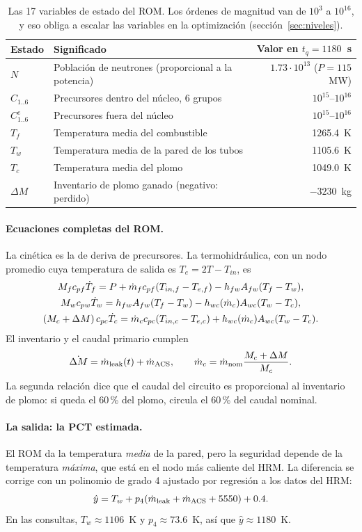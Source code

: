 \begin{table}[H]\centering\small
\begin{tabularx}{\linewidth}{@{}l Y r@{}}\toprule
Estado & Significado & Valor en $t_q=1180$~s\\\midrule
$N$ & Población de neutrones (proporcional a la potencia) & $1.73\cdot10^{13}$ ($P=115$~MW)\\
$C_{1..6}$ & Precursores dentro del núcleo, 6 grupos & $10^{15}$--$10^{16}$\\
$C^e_{1..6}$ & Precursores fuera del núcleo & $10^{15}$--$10^{16}$\\
$T_f$ & Temperatura media del combustible & 1265.4~K\\
$T_w$ & Temperatura media de la pared de los tubos & 1105.6~K\\
$T_c$ & Temperatura media del plomo & 1049.0~K\\
$\Delta M$ & Inventario de plomo ganado (negativo: perdido) & $-3230$~kg\\\bottomrule
\end{tabularx}
\caption{Las 17 variables de estado del ROM. Los órdenes de magnitud van de $10^3$ a
$10^{16}$, y eso obliga a escalar las variables en la optimización
(sección~\ref{sec:niveles}).}
\label{tab:estado}
\end{table}

\paragraph{Ecuaciones completas del ROM.} La cinética es la de deriva de precursores. La
termohidráulica, con un nodo promedio cuya temperatura de salida es $T_e=2T-T_{in}$, es
\begin{gather*}
M_fc_{pf}\dot T_f=P+\dot m_fc_{pf}(T_{in,f}-T_{e,f})-h_{fw}A_{fw}(T_f-T_w),\\
M_wc_{pw}\dot T_w=h_{fw}A_{fw}(T_f-T_w)-h_{wc}(\dot m_c)A_{wc}(T_w-T_c),\\
(M_c+\Delta M)\,c_{pc}\dot T_c=\dot m_cc_{pc}(T_{in,c}-T_{e,c})+h_{wc}(\dot m_c)A_{wc}(T_w-T_c).
\end{gather*}
El inventario y el caudal primario cumplen
\[
\dot{\Delta M}=\dot m_{\rm leak}(t)+\dot m_{\rm ACS},\qquad
\dot m_c=\dot m_{\rm nom}\frac{M_c+\Delta M}{M_c}.
\]
La segunda relación dice que el caudal del circuito es proporcional al inventario de plomo:
si queda el 60\,\% del plomo, circula el 60\,\% del caudal nominal.

\paragraph{La salida: la PCT estimada.} El ROM da la temperatura \emph{media} de la pared,
pero la seguridad depende de la temperatura \emph{máxima}, que está en el nodo más caliente
del HRM. La diferencia se corrige con un polinomio de grado 4 ajustado por regresión a los
datos del HRM:
\[
\hat y=T_w+p_4(\dot m_{\rm leak}+\dot m_{\rm ACS}+5550)+0.4 .
\]
En las consultas, $T_w\approx1106$~K y $p_4\approx73.6$~K, así que $\hat y\approx1180$~K.

